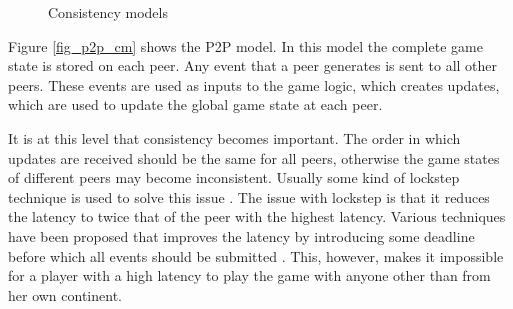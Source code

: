 \documentclass[journal,oneside,a4paper,onecolumn]{IEEEtran}
\begin{document}
\begin{figure}[htbp]
\centering
{}
\caption{Consistency models}
\end{figure}
%
Figure \ref{fig_p2p_cm} shows the P2P model. In this model the complete game state is stored on each peer. Any event that a peer generates is sent to all other peers. These events are used as inputs to the game logic, which creates updates, which are used to update the global game state at each peer.

It is at this level that consistency becomes important. The order in which updates are received should be the same for all peers, otherwise the game states of different peers may become inconsistent. Usually some kind of lockstep technique is used to solve this issue \cite{pessimistic_lock_step}. The issue with lockstep is that it reduces the latency to twice that of the peer with the highest latency. Various techniques have been proposed that improves the latency by introducing some deadline before which all events should be submitted \cite{cheat_proof_event_ordering}. This, however, makes it impossible for a player with a high latency to play the game with anyone other than from her own continent.
\end{document}
